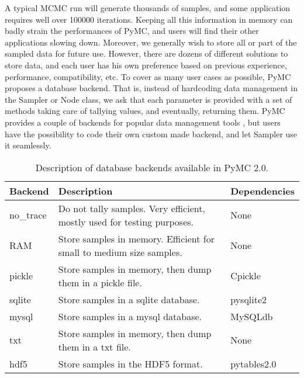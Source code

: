 

A typical MCMC run will generate thousands of samples, and some application requires well over 100000 iterations. Keeping all this information in memory can badly strain the performances of PyMC, and users will find their other applications slowing down. Moreover, we generally wish to store all or part of the sampled data for future use. However, there are dozens of different solutions to store data, and each user has his own preference based on previous experience, performance, compatibility, etc. To cover as many user cases as possible, PyMC proposes a database backend. That is, instead of hardcoding data management in the Sampler or Node class, we ask that each parameter is provided with a set of methods taking care of tallying values, and eventually, returning them. PyMC provides a couple of backends for popular data management tools , but users have the possibility to code their own custom made backend, and let Sampler use it seamlessly.

\begin{longtable}[c]{|p{0.12\locallinewidth}|p{0.60\locallinewidth}|p{0.20\locallinewidth}|}
\caption{Description of database backends available in PyMC 2.0.}\\
\hline
\textbf{
Backend
} & \textbf{
Description
} & \textbf{
Dependencies
} \\
\hline
\endhead

no{\_}trace
 & 
Do not tally samples. Very efficient, mostly used
for testing purposes.
 & 
None
 \\
\hline

RAM
 & 
Store samples in memory. Efficient for small to
medium size samples.
 & 
None
 \\
\hline

pickle
 & 
Store samples in memory, then dump them in a
pickle file.
 & 
Cpickle
 \\
\hline

sqlite
 & 
Store samples in a sqlite database.
 & 
pysqlite2
 \\
\hline

mysql
 & 
Store samples in a mysql database.
 & 
MySQLdb
 \\
\hline

txt
 & 
Store samples in memory, then dump them in a txt
file.
 & 
None
 \\
\hline

hdf5
 & 
Store samples in the HDF5 format.
 & 
pytables2.0
 \\
\hline
\end{longtable}

